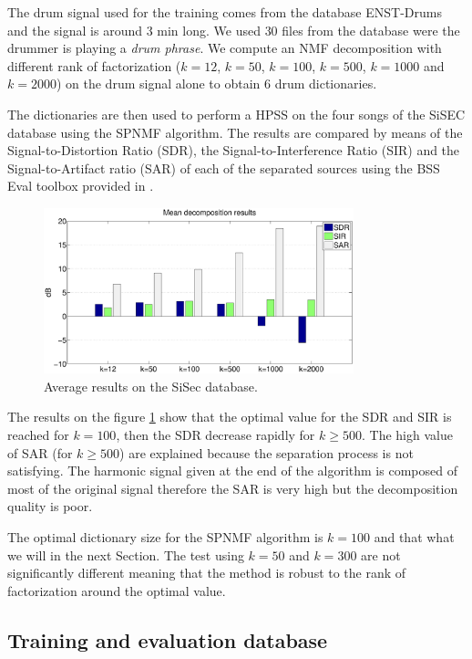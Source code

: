 \documentclass{article}
\begin{document}
The drum signal used for the training comes from the database ENST-Drums \cite{gillet2006enst} and the signal is around $3$ min long. We used $30$ files from the database were the drummer is playing a \emph{drum phrase}. We compute an NMF decomposition with different rank of factorization ($k=12$, $k=50$, $k=100$, $k=500$, $k=1000$ and $k=2000$) on the drum signal alone to obtain $6$  drum dictionaries.

The dictionaries are then used to perform a HPSS on the four songs of the SiSEC database using the SPNMF algorithm. The results are compared by means of the Signal-to-Distortion Ratio (SDR), the Signal-to-Interference Ratio (SIR) and the Signal-to-Artifact ratio (SAR) of each of the separated sources using the BSS Eval toolbox provided in \cite{bsseval}.

\begin{figure}[h]

  \centering 
  \includegraphics[width=9cm]{figs/AllDictSizeISMIR.eps}
  \caption{\label{dictsize} Average results on the SiSec database.}
  
\end{figure}

The results on the figure \ref{dictsize} show that the optimal value for the SDR and SIR is reached for $k=100$, then the SDR decrease rapidly for $k\geqslant 500$. The high value of SAR (for $k\geqslant 500$) are explained because the separation process is not satisfying. The harmonic signal given at the end of the algorithm is composed of most of the original signal therefore the SAR is very high but the decomposition quality is poor. 

The optimal dictionary size for the SPNMF algorithm is $k=100$ and that what we will in the next Section. The test using $k=50$ and $k=300$ are not significantly different meaning that the method is robust to the rank of factorization around the optimal value. 

\subsection{Training and evaluation database}\label{database}
\end{document}

